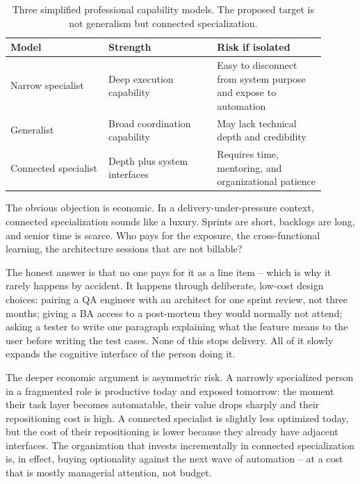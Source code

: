 \documentclass[11pt,a4paper]{article}
\begin{document}
\begin{table}[h!]
\centering
\small
\begin{tabular}{p{0.28\linewidth}p{0.31\linewidth}p{0.31\linewidth}}
\toprule
\textbf{Model} & \textbf{Strength} & \textbf{Risk if isolated} \\
\midrule
Narrow specialist & Deep execution capability & Easy to disconnect from system purpose and expose to automation \\
Generalist & Broad coordination capability & May lack technical depth and credibility \\
Connected specialist & Depth plus system interfaces & Requires time, mentoring, and organizational patience \\
\bottomrule
\end{tabular}
\caption{Three simplified professional capability models. The proposed target is not generalism but connected specialization.}
\end{table}



The obvious objection is economic. In a delivery-under-pressure context, connected specialization sounds like a luxury. Sprints are short, backlogs are long, and senior time is scarce. Who pays for the exposure, the cross-functional learning, the architecture sessions that are not billable?

The honest answer is that no one pays for it as a line item -- which is why it rarely happens by accident. It happens through deliberate, low-cost design choices: pairing a QA engineer with an architect for one sprint review, not three months; giving a BA access to a post-mortem they would normally not attend; asking a tester to write one paragraph explaining what the feature means to the user before writing the test cases. None of this stops delivery. All of it slowly expands the cognitive interface of the person doing it.

The deeper economic argument is asymmetric risk. A narrowly specialized person in a fragmented role is productive today and exposed tomorrow: the moment their task layer becomes automatable, their value drops sharply and their repositioning cost is high. A connected specialist is slightly less optimized today, but the cost of their repositioning is lower because they already have adjacent interfaces. The organization that invests incrementally in connected specialization is, in effect, buying optionality against the next wave of automation -- at a cost that is mostly managerial attention, not budget.
\end{document}
